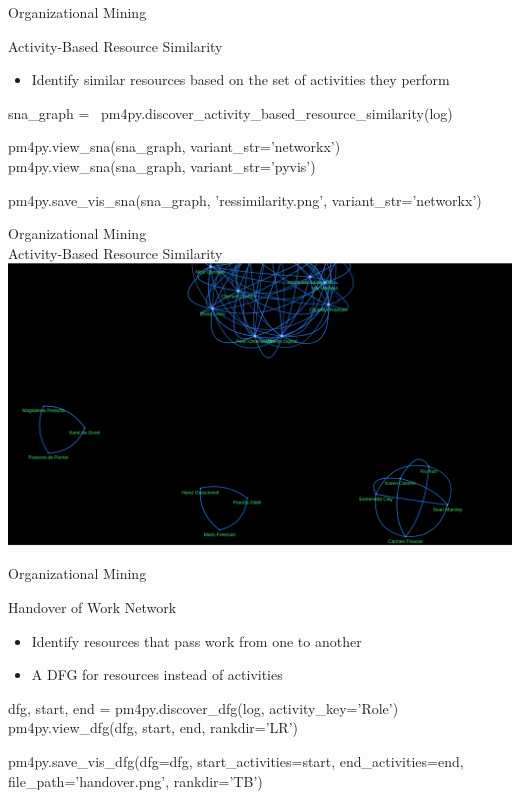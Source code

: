 \documentclass[ignorenonframetext,xcolor=x11names]{beamer}
\begin{document}
\begin{frame}[fragile]{Organizational Mining}
\begin{block}{Activity-Based Resource Similarity}
\begin{itemize}
   \item Identify similar resources based on the set of activities they perform
\end{itemize}
\end{block}
\footnotesize
\begin{pythoncode}
sna_graph = \
 pm4py.discover_activity_based_resource_similarity(log)

pm4py.view_sna(sna_graph, variant_str='networkx')
pm4py.view_sna(sna_graph, variant_str='pyvis')

pm4py.save_vis_sna(sna_graph, 'ressimilarity.png',
    variant_str='networkx')
\end{pythoncode}
\end{frame}

\begin{frame}{Organizational Mining \\ \small Activity-Based Resource Similarity}
\centering
\includegraphics[width=.9\textwidth]{screen3.png}
\end{frame}

\begin{frame}[fragile]{Organizational Mining}
\begin{block}{Handover of Work Network}
\begin{itemize}
   \item Identify resources that pass work from one to another
   \item A DFG for resources instead of activities
\end{itemize}
\end{block}
\footnotesize
\begin{pythoncode}
dfg, start, end = pm4py.discover_dfg(log,
    activity_key='Role')
pm4py.view_dfg(dfg, start, end, rankdir='LR')

pm4py.save_vis_dfg(dfg=dfg,
    start_activities=start, 
    end_activities=end, 
    file_path='handover.png', rankdir='TB')
\end{pythoncode}
\end{frame}
\end{document}
